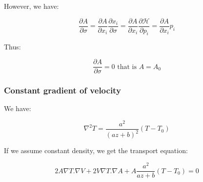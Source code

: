 \documentclass[methods.tex]{subfiles}
\begin{document}
However, we have:

\begin{equation}
\frac{\partial A}{\partial \sigma} = \frac{\partial A}{\partial x_i} \frac{\partial x_i}{\partial \sigma} = \frac{\partial A}{\partial x_i} \frac{\partial \mathcal H}{\partial p_i} = \frac{\partial A}{\partial x_i} p_i
\end{equation}

Thus:

\begin{equation}
\frac{\partial A}{\partial \sigma} = 0 \text{ that is } A = A_0
\end{equation}

\subsubsection{Constant gradient of velocity}

We have:

\begin{equation}
\nabla^2 T = \frac{a^2}{(a z + b)^2} (T - T_0)
\end{equation}

If we assume constant density, we get the transport equation:

\begin{equation}
2 A \nabla T . \nabla V + 2 V \nabla T . \nabla A + A \frac{a^2}{a z + b} (T - T_0) = 0
\end{equation}
\end{document}
